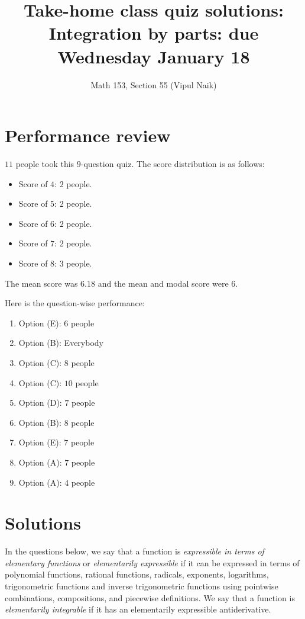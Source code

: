 \documentclass[10pt]{amsart}
\title{Take-home class quiz solutions: Integration by parts: due Wednesday January 18}
\author{Math 153, Section 55 (Vipul Naik)}
\begin{document}
\maketitle

\section{Performance review}

$11$ people took this $9$-question quiz. The score distribution is as
follows:

\begin{itemize}
\item Score of $4$: $2$ people.
\item Score of $5$: $2$ people.
\item Score of $6$: $2$ people.
\item Score of $7$: $2$ people.
\item Score of $8$: $3$ people.
\end{itemize}

The mean score was $6.18$ and the mean and modal score were $6$.

Here is the question-wise performance:

\begin{enumerate}
\item Option (E): $6$ people
\item Option (B): Everybody
\item Option (C): $8$ people
\item Option (C): $10$ people
\item Option (D): $7$ people
\item Option (B): $8$ people
\item Option (E): $7$ people
\item Option (A): $7$ people
\item Option (A): $4$ people
\end{enumerate}

\section{Solutions}

In the questions below, we say that a function is {\em expressible in
terms of elementary functions} or {\em elementarily expressible} if it
can be expressed in terms of polynomial functions, rational functions,
radicals, exponents, logarithms, trigonometric functions and inverse
trigonometric functions using pointwise combinations, compositions,
and piecewise definitions. We say that a function is {\em elementarily
integrable} if it has an elementarily expressible antiderivative.
\end{document}
